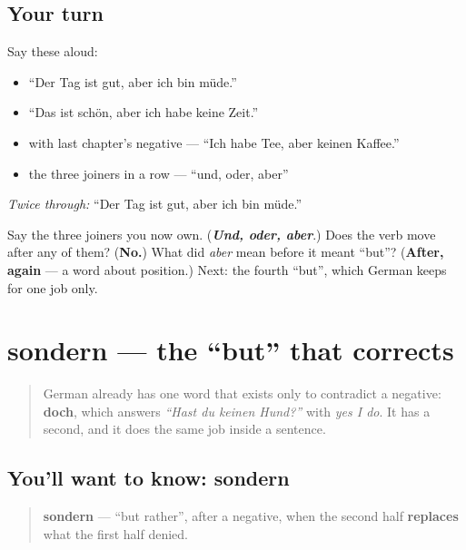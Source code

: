 \subsection*{Your turn}
Say these aloud:

\begin{itemize}
\raggedright
  \item \textquotedblleft{}Der Tag ist gut, aber ich bin müde.\textquotedblright{}
  \item \textquotedblleft{}Das ist schön, aber ich habe keine Zeit.\textquotedblright{}
  \item with last chapter's negative — \textquotedblleft{}Ich habe Tee, aber keinen Kaffee.\textquotedblright{}
  \item the three joiners in a row — \textquotedblleft{}und, oder, aber\textquotedblright{}
\end{itemize}

\emph{Twice through:} \textquotedblleft{}Der Tag ist gut, aber ich bin müde.\textquotedblright{}

\begin{tcolorbox}[breakable,colback=teal!4,colframe=teal!35!black,title={Before you move on}]
Say the three joiners you now own. (\emph{\textbf{Und, oder, aber}}.) Does the verb move after any of them? (\textbf{No.}) What did \emph{aber} mean before it meant \textquotedblleft{}but\textquotedblright{}? (\textbf{After, again} — a word about position.) Next: the fourth \textquotedblleft{}but\textquotedblright{}, which German keeps for one job only.
\end{tcolorbox}
\section[sondern]{sondern — the \textquotedblleft{}but\textquotedblright{} that corrects}

\label{lesson:GE-C35-sondern}



\begin{quote}
German already has one word that exists only to contradict a negative: \textbf{doch}, which answers \emph{\textquotedblleft{}Hast du keinen Hund?\textquotedblright{}} with \emph{yes I do}. It has a second, and it does the same job inside a sentence.
\end{quote}

\subsection*{You'll want to know: sondern}
\begin{quote}
\textbf{sondern} — \textquotedblleft{}but rather\textquotedblright{}, after a negative, when the second half \textbf{replaces} what the first half denied.
\end{quote}

